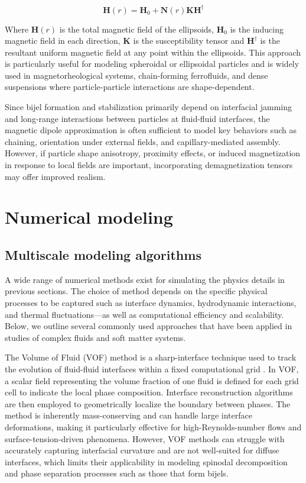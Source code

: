 \begin{equation}
    \mathbf{H}(r) = \mathbf{H}_0 + \mathbf{N}(r)\mathbf{K}\mathbf{H}^{\dagger}
\end{equation}

Where $\mathbf{H}(r)$ is the total magnetic field of the ellipsoids, $\mathbf{H}_0$ is the inducing magnetic field in each direction,
$\mathbf{K}$ is the susceptibility tensor and $\mathbf{H}^{\dagger}$ is the resultant uniform magnetic field at any point within
the ellipsoids. \cite{takahashi_ellipsoids_2017}  This approach is particularly useful for modeling spheroidal or ellipsoidal particles and is widely 
used in magnetorheological systems, chain-forming ferrofluids, and dense suspensions where particle-particle interactions are shape-dependent.

Since bijel formation and stabilization primarily depend on interfacial 
jamming and long-range interactions between particles at fluid-fluid interfaces, the magnetic dipole approximation is often sufficient to model key behaviors such as chaining, orientation under external 
fields, and capillary-mediated assembly. However, if particle shape anisotropy, proximity effects, or induced magnetization in response to local fields are important, incorporating demagnetization tensors 
may offer improved realism.

\section{Numerical modeling}

\subsection{Multiscale modeling algorithms}

A wide range of numerical methods exist for simulating the physics details in previous sections. The choice of method depends on the specific physical processes to be captured such as 
interface dynamics, hydrodynamic interactions, and thermal fluctuations—as well as computational efficiency and scalability. Below, we outline several commonly used approaches that have been 
applied in studies of complex fluids and soft matter systems.

The Volume of Fluid (VOF) method is a sharp-interface technique used to track the evolution of fluid-fluid interfaces within a fixed computational grid 
\cite{gopala_volume_2008, fleckenstein_volume-fluid-based_2015, deising_direct_2018}. In VOF, a scalar field representing the volume fraction of one 
fluid is defined for each grid cell to indicate the local phase composition. Interface reconstruction algorithms are then employed to geometrically 
localize the boundary between phases. The method is inherently mass-conserving and can handle large interface deformations, making it particularly 
effective for high-Reynolds-number flows and surface-tension-driven phenomena. However, VOF methods can struggle with accurately capturing interfacial 
curvature and are not well-suited for diffuse interfaces, which limits their applicability in modeling spinodal decomposition and phase separation 
processes such as those that form bijels.

